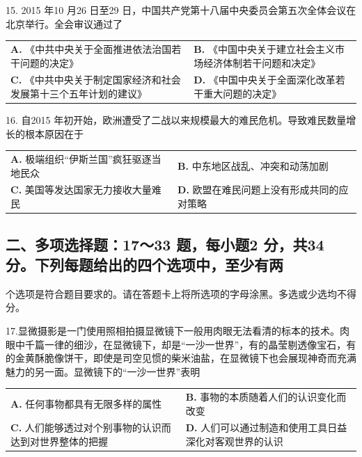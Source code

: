 \documentclass[UTF8,11pt]{ctexart}
\begin{document}
15. 2015 年10 月26 日至29 日，中国共产党第十八届中央委员会第五次全体会议在北京举行。全会审议通过了


\begin{center}\begin{tabular}{>{\raggedright\arraybackslash}p{\dimexpr(\linewidth-4\tabcolsep)/2\relax}>{\raggedright\arraybackslash}p{\dimexpr(\linewidth-4\tabcolsep)/2\relax}}
\textbf{A.} 《中共中央关于全面推进依法治国若干问题的决定》 & \textbf{B.} 《中国中央关于建立社会主义市场经济体制若干问题和决定》\\[.35em]
\textbf{C.} 《中共中央关于制定国家经济和社会发展第十三个五年计划的建议》 & \textbf{D.} 《中国中央关于全面深化改革若干重大问题的决定》\\[.35em]\end{tabular}\end{center}

16. 自2015 年初开始，欧洲遭受了二战以来规模最大的难民危机。导致难民数量增长的根本原因在于


\begin{center}\begin{tabular}{>{\raggedright\arraybackslash}p{\dimexpr(\linewidth-4\tabcolsep)/2\relax}>{\raggedright\arraybackslash}p{\dimexpr(\linewidth-4\tabcolsep)/2\relax}}
\textbf{A.} 极端组织“伊斯兰国”疯狂驱逐当地民众 & \textbf{B.} 中东地区战乱、冲突和动荡加剧\\[.35em]
\textbf{C.} 美国等发达国家无力接收大量难民 & \textbf{D.} 欧盟在难民问题上没有形成共同的应对策略\\[.35em]\end{tabular}\end{center}

\subsection*{二、多项选择题：17～33 题，每小题2 分，共34 分。下列每题给出的四个选项中，至少有两}

个选项是符合题目要求的。请在答题卡上将所选项的字母涂黑。多选或少选均不得分。


17.显微摄影是一门使用照相拍摄显微镜下一般用肉眼无法看清的标本的技术。肉眼中千篇一律的细沙，在显微镜下，却是“一沙一世界”，有的晶莹剔透像宝石，有的金黄酥脆像饼干，即使是司空见惯的柴米油盐，在显微镜下也会展现神奇而充满魅力的另一面。显微镜下的“一沙一世界”表明


\begin{center}\begin{tabular}{>{\raggedright\arraybackslash}p{\dimexpr(\linewidth-4\tabcolsep)/2\relax}>{\raggedright\arraybackslash}p{\dimexpr(\linewidth-4\tabcolsep)/2\relax}}
\textbf{A.} 任何事物都具有无限多样的属性 & \textbf{B.} 事物的本质随着人们的认识变化而改变\\[.35em]
\textbf{C.} 人们能够透过对个别事物的认识而达到对世界整体的把握 & \textbf{D.} 人们可以通过制造和使用工具日益深化对客观世界的认识\\[.35em]\end{tabular}\end{center}
\end{document}
